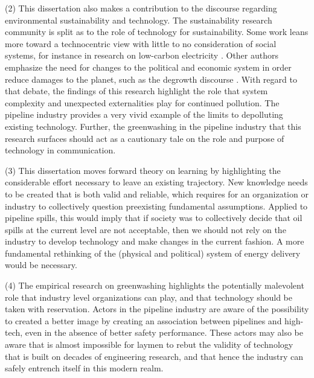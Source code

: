 (2) This dissertation also makes a contribution to the discourse regarding environmental sustainability and technology. The sustainability research community is split as to the role of technology for sustainability. Some work leans more toward a technocentric view with little to no consideration of social systems, for instance in research on low-carbon electricity \citep[e.g.,][]{Greenblatt2017}. Other authors emphasize the need for changes to the political and economic system in order reduce damages to the planet, such as the degrowth discourse \citep{Kallis2018}. With regard to that debate, the findings of this research highlight the role that system complexity and unexpected externalities play for continued pollution. The pipeline industry provides a very vivid example of the limits to depolluting existing technology. Further, the greenwashing in the pipeline industry that this research surfaces should act as a cautionary tale on the role and purpose of technology in communication.

(3) This dissertation moves forward theory on learning by highlighting the considerable effort necessary to leave an existing trajectory. New knowledge needs to be created that is both valid and reliable, which requires for an organization or industry to collectively question preexisting fundamental assumptions. Applied to pipeline spills, this would imply that if society was to collectively decide that oil spills at the current level are not acceptable, then we should not rely on the industry to develop technology and make changes in the current fashion. A more fundamental rethinking of the (physical and political) system of energy delivery would be necessary.

(4) The empirical research on greenwashing highlights the potentially malevolent role that industry level organizations can play, and that technology should be taken with reservation. Actors in the pipeline industry are aware of the possibility to created a better image by creating an association between pipelines and high-tech, even in the absence of better safety performance. These actors may also be aware that is almost impossible for laymen to rebut the validity of technology that is built on decades of engineering research, and that hence the industry can safely entrench itself in this modern realm.

